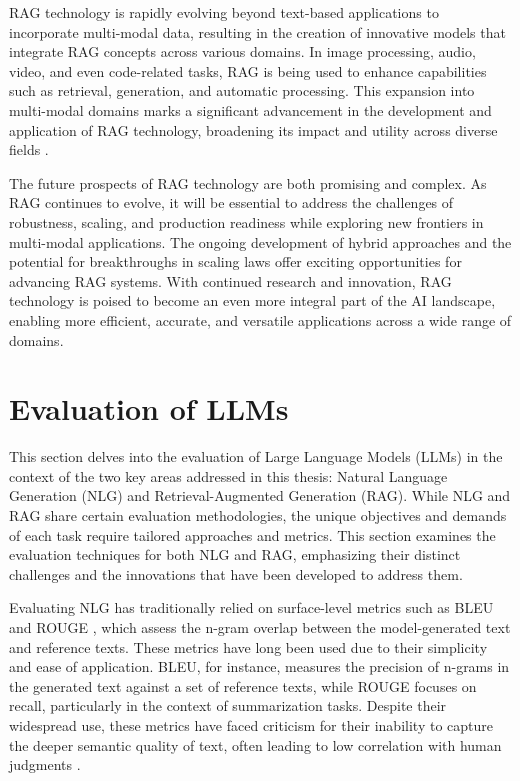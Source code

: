 RAG technology is rapidly evolving beyond text-based applications to incorporate multi-modal data, resulting in the creation of innovative models that integrate RAG concepts across various domains. In image processing, audio, video, and even code-related tasks, RAG is being used to enhance capabilities such as retrieval, generation, and automatic processing. This expansion into multi-modal domains marks a significant advancement in the development and application of RAG technology, broadening its impact and utility across diverse fields \cite{gao2023retrieval}.

The future prospects of RAG technology are both promising and complex. As RAG continues to evolve, it will be essential to address the challenges of robustness, scaling, and production readiness while exploring new frontiers in multi-modal applications. The ongoing development of hybrid approaches and the potential for breakthroughs in scaling laws offer exciting opportunities for advancing RAG systems. With continued research and innovation, RAG technology is poised to become an even more integral part of the AI landscape, enabling more efficient, accurate, and versatile applications across a wide range of domains.

\section{Evaluation of LLMs}


This section delves into the evaluation of Large Language Models (LLMs) in the context of the two key areas addressed in this thesis: Natural Language Generation (NLG) and Retrieval-Augmented Generation (RAG). While NLG and RAG share certain evaluation methodologies, the unique objectives and demands of each task require tailored approaches and metrics. This section examines the evaluation techniques for both NLG and RAG, emphasizing their distinct challenges and the innovations that have been developed to address them.

Evaluating NLG has traditionally relied on surface-level metrics such as BLEU \cite{papineni2002bleu} and ROUGE \cite{lin2004rouge}, which assess the n-gram overlap between the model-generated text and reference texts. These metrics have long been used due to their simplicity and ease of application. BLEU, for instance, measures the precision of n-grams in the generated text against a set of reference texts, while ROUGE focuses on recall, particularly in the context of summarization tasks. Despite their widespread use, these metrics have faced criticism for their inability to capture the deeper semantic quality of text, often leading to low correlation with human judgments \cite{sulem2018bleu}.

